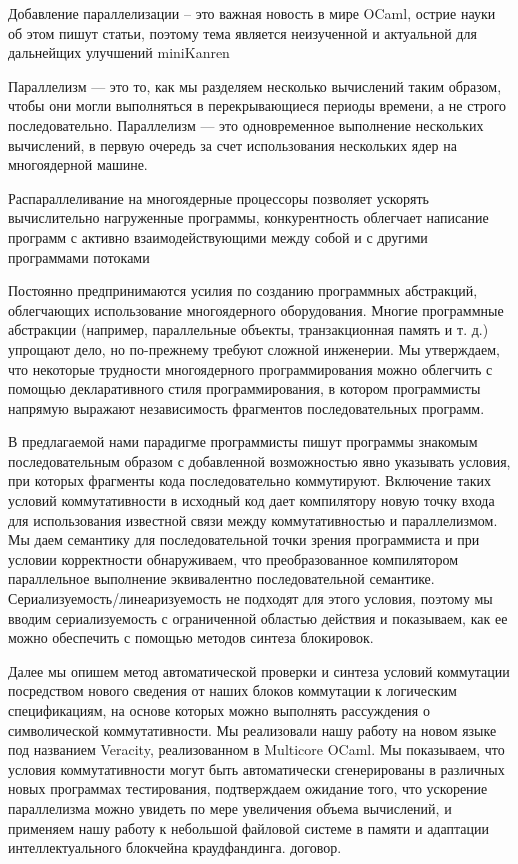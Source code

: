 

Добавление параллелизации -- это важная новость в мире OCaml, острие науки об этом пишут статьи,
поэтому тема является неизученной и актуальной для дальнейщих улучшений miniKanren

Параллелизм — это то, как мы разделяем несколько вычислений таким образом, чтобы они могли выполняться в перекрывающиеся периоды времени, а не строго последовательно. Параллелизм — это одновременное выполнение нескольких вычислений, в первую очередь за счет использования нескольких ядер на многоядерной машине.  

Распараллеливание на многоядерные процессоры позволяет ускорять вычислительно нагруженные программы, конкурентность облегчает написание программ с активно взаимодействующими между собой и с другими программами потоками

Постоянно предпринимаются усилия по созданию программных абстракций, облегчающих использование многоядерного оборудования. Многие программные абстракции (например, параллельные объекты, транзакционная память и т. д.) упрощают дело, но по-прежнему требуют сложной инженерии. Мы утверждаем, что некоторые трудности многоядерного программирования можно облегчить с помощью декларативного стиля программирования, в котором программисты напрямую выражают независимость фрагментов последовательных программ.

В предлагаемой нами парадигме программисты пишут программы знакомым последовательным образом с добавленной возможностью явно указывать условия, при которых фрагменты кода последовательно коммутируют. Включение таких условий коммутативности в исходный код дает компилятору новую точку входа для использования известной связи между коммутативностью и параллелизмом. Мы даем семантику для последовательной точки зрения программиста и при условии корректности обнаруживаем, что преобразованное компилятором параллельное выполнение эквивалентно последовательной семантике. Сериализуемость/линеаризуемость не подходят для этого условия, поэтому мы вводим сериализуемость с ограниченной областью действия и показываем, как ее можно обеспечить с помощью методов синтеза блокировок.

Далее мы опишем метод автоматической проверки и синтеза условий коммутации посредством нового сведения от наших блоков коммутации к логическим спецификациям, на основе которых можно выполнять рассуждения о символической коммутативности. Мы реализовали нашу работу на новом языке под названием Veracity, реализованном в Multicore OCaml. Мы показываем, что условия коммутативности могут быть автоматически сгенерированы в различных новых программах тестирования, подтверждаем ожидание того, что ускорение параллелизма можно увидеть по мере увеличения объема вычислений, и применяем нашу работу к небольшой файловой системе в памяти и адаптации интеллектуального блокчейна краудфандинга. договор.


